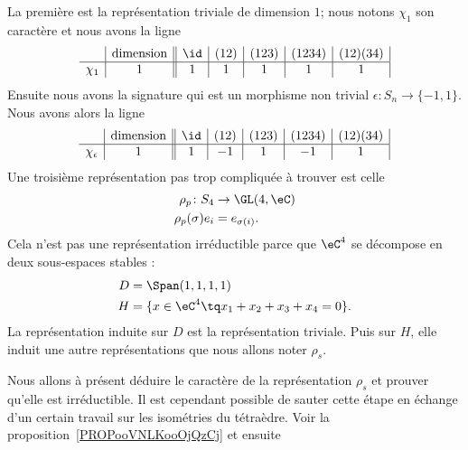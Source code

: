 La première est la représentation triviale de dimension \( 1\); nous notons \( \chi_1\) son caractère et nous avons la ligne
\begin{equation}
	\begin{array}[]{c|c||c|c|c|c|c|}
		       & \text{dimension} & \id & (12) & (123) & (1234) & (12)(34) \\
		\hline
		\chi_1 & 1                & 1   & 1    & 1     & 1      & 1        \\
	\end{array}
\end{equation}
Ensuite nous avons la signature qui est un morphisme non trivial \( \epsilon\colon S_n\to \{ -1,1 \}\). Nous avons alors la ligne
\begin{equation}    \label{EqGNRavtl}
	\begin{array}[]{c|c||c|c|c|c|c|}
		                & \text{dimension} & \id & (12) & (123) & (1234) & (12)(34) \\
		\hline
		\chi_{\epsilon} & 1                & 1   & -1   & 1     & -1     & 1        \\
	\end{array}
\end{equation}
Une troisième représentation pas trop compliquée à trouver est celle
\begin{equation}
	\begin{aligned}
		\rho_p\colon S_4  & \to \GL(4,\eC)  \\
		\rho_p(\sigma)e_i & =e_{\sigma(i)}.
	\end{aligned}
\end{equation}
Cela n'est pas une représentation irréductible parce que \( \eC^4\) se décompose en deux sous-espaces stables :
\begin{subequations}
	\begin{align}
		D & =\Span(1,1,1,1)                        \\
		H & =\{ x\in\eC^4\tq x_1+x_2+x_3+x_4=0 \}.
	\end{align}
\end{subequations}
La représentation induite sur \( D\) est la représentation triviale. Puis sur \( H\), elle induit une autre représentations que nous allons noter \( \rho_s\).

Nous allons à présent déduire le caractère de la représentation \( \rho_s\) et prouver qu'elle est irréductible. Il est cependant possible de sauter cette étape en échange d'un certain travail sur les isométries du tétraèdre. Voir la proposition~\ref{PROPooVNLKooOjQzCj} et ensuite

